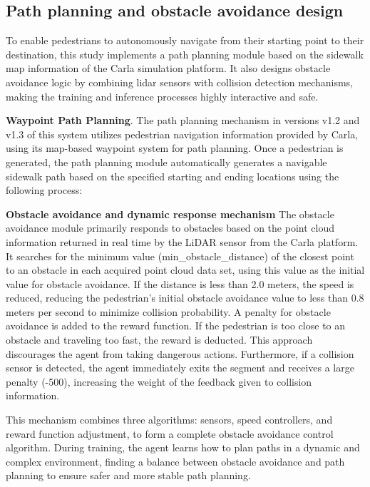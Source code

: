 \documentclass[lettersize,journal]{IEEEtran}
\begin{document}
\subsection{Path planning and obstacle avoidance design}

To enable pedestrians to autonomously navigate from their starting point to their destination, this study implements a path planning module based on the sidewalk map information of the Carla simulation platform. 
It also designs obstacle avoidance logic by combining lidar sensors with collision detection mechanisms, making the training and inference processes highly interactive and safe.


\textbf{Waypoint Path Planning}.
The path planning mechanism in versions v1.2 and v1.3 of this system utilizes pedestrian navigation information provided by Carla, using its map-based waypoint system for path planning. Once a pedestrian is generated, the path planning module automatically generates a navigable sidewalk path based on the specified starting and ending locations using the following process:



\textbf{Obstacle avoidance and dynamic response mechanism}
The obstacle avoidance module primarily responds to obstacles based on the point cloud information returned in real time by the LiDAR sensor from the Carla platform. 
It searches for the minimum value (min\_obstacle\_distance) of the closest point to an obstacle in each acquired point cloud data set, using this value as the initial value for obstacle avoidance. 
If the distance is less than 2.0 meters, the speed is reduced, reducing the pedestrian's initial obstacle avoidance value to less than 0.8 meters per second to minimize collision probability. 
A penalty for obstacle avoidance is added to the reward function. 
If the pedestrian is too close to an obstacle and traveling too fast, the reward is deducted. 
This approach discourages the agent from taking dangerous actions. 
Furthermore, if a collision sensor is detected, the agent immediately exits the segment and receives a large penalty (-500), increasing the weight of the feedback given to collision information.


This mechanism combines three algorithms: sensors, speed controllers, and reward function adjustment, to form a complete obstacle avoidance control algorithm. 
During training, the agent learns how to plan paths in a dynamic and complex environment, finding a balance between obstacle avoidance and path planning to ensure safer and more stable path planning.
\end{document}
